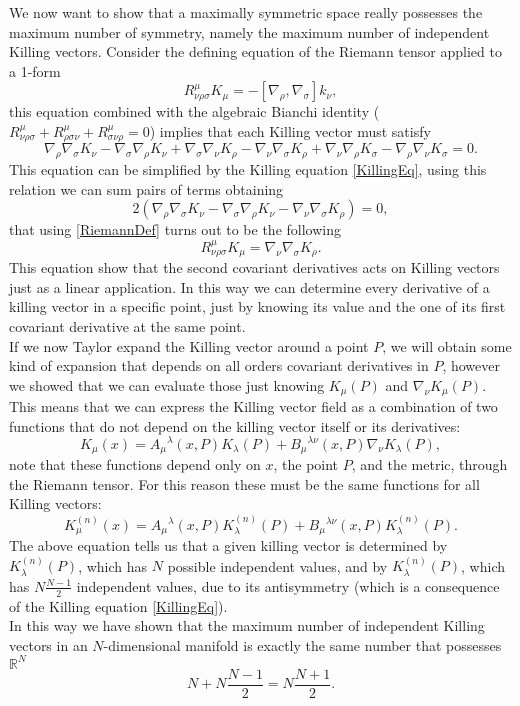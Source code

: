 We now want to show that a maximally symmetric space really possesses the maximum number of symmetry, namely the maximum number of independent Killing vectors.
Consider the defining equation of the Riemann tensor applied to a 1-form
\begin{equation}
    R^{\mu}_{\nu\rho\sigma}K_\mu=-[\nabla_\rho,\nabla_\sigma]k_\nu,\label{RiemannDef}
\end{equation}
this equation combined with the algebraic Bianchi identity ($R^\mu_{\nu\rho\sigma}+R^\mu_{\rho\sigma\nu}+R^\mu_{\sigma\nu\rho}=0 $) implies that each Killing vector must satisfy
$$\nabla_\rho\nabla_\sigma K_\nu-\nabla_\sigma\nabla_\rho K_\nu +\nabla_\sigma\nabla_\nu K_\rho-\nabla_\nu\nabla_\sigma K_\rho+\nabla_\nu\nabla_\rho K_\sigma-\nabla_\rho\nabla_\nu K_\sigma=0.$$
This equation can be simplified by the Killing equation \eqref{KillingEq}, using this relation we can sum pairs of terms obtaining $$ 2(\nabla_\rho\nabla_\sigma K_\nu-\nabla_\sigma\nabla_\rho K_\nu -\nabla_\nu\nabla_\sigma K_\rho)=0,$$ that using \eqref{RiemannDef} turns out to be the following
\begin{equation}
    R^\mu_{\nu\rho\sigma}K_\mu=\nabla_\nu\nabla_\sigma K_\rho. \label{RNabla}
\end{equation}
This equation show that the second covariant derivatives acts on Killing vectors just as a linear application. In this way we can determine every derivative of a killing vector in a specific point, just by knowing its value and the one of its first covariant derivative at the same point.\\
If we now Taylor expand the Killing vector around a point $P$, we will obtain some kind of expansion that depends on all orders covariant derivatives in $P$, however we showed that we can evaluate those just knowing $K_\mu(P)$ and $\nabla_\nu K_\mu(P)$. This means that we can express the Killing vector field as a combination of two functions that do not depend on the killing vector itself or its derivatives:
\begin{equation*}
    K_\mu(x)=A_\mu\phantom{}^\lambda(x,P)K_\lambda(P)+B_\mu\phantom{}^{\lambda\nu}(x,P)\nabla_\nu K_\lambda(P),
\end{equation*}
note that these functions depend only on $x$, the point $P$, and the metric, through the Riemann tensor. For this reason these must be the same functions for all Killing vectors:
\begin{equation}\label{KillingExp}
    K_\mu^{(n)}(x)=A_\mu\phantom{}^\lambda(x,P)K_\lambda^{(n)}(P)+B_\mu\phantom{}^{\lambda\nu}(x,P)K_\lambda^{(n)}(P).
\end{equation}
The above equation tells us that a given killing vector is determined by $K_\lambda^{(n)}(P)$, which has $N$ possible independent values, and by $K_\lambda^{(n)}(P)$, which has $N\frac{N-1}{2}$ independent values, due to its antisymmetry (which is a consequence of the Killing equation \eqref{KillingEq}).\\
In this way we have shown that the maximum number of independent Killing vectors in an $N$-dimensional manifold is exactly the same number that possesses $\mathbb{R}^N$ $$N+N\frac{N-1}{2}=N\frac{N+1}{2}.$$

